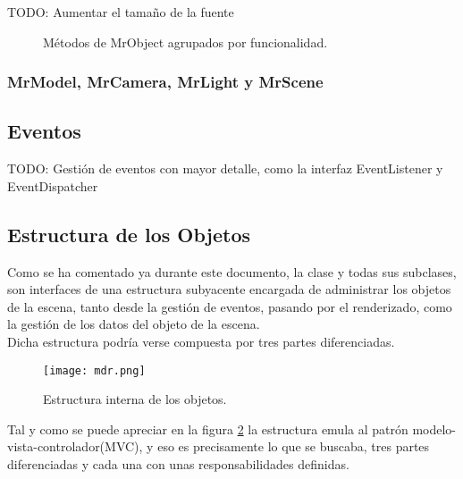 TODO: Aumentar el tamaño de la fuente
\begin{figure}[h!]
\centering
{}
\hspace{0mm}
\caption[Métodos de MrObject]{Métodos de MrObject agrupados por funcionalidad.}
\label{fig:metodosmrobject}
\end{figure}

\subsubsection{MrModel, MrCamera, MrLight y MrScene}

\subsection{Eventos}
TODO: Gestión de eventos con mayor detalle, como la interfaz EventListener y EventDispatcher


\subsection{Estructura de los Objetos}
Como se ha comentado ya durante este documento, la clase \rorefobject y todas sus subclases, son interfaces de una estructura subyacente encargada de administrar los objetos de la escena, tanto desde la gestión de eventos, pasando por el renderizado, como la gestión de los datos del objeto de la escena.\\
Dicha estructura podría verse compuesta por tres partes diferenciadas.

\begin{figure}[h!]
\begin{center}
\texttt{[image: mdr.png]}
\end{center}
\caption[Estructura interna de los objetos]{Estructura interna de los objetos.}
\label{fig:mdr}
\end{figure}

Tal y como se puede apreciar en la figura \ref{fig:mdr} la estructura emula al patrón modelo-vista-controlador(MVC), y eso es precisamente lo que se buscaba, tres partes diferenciadas y cada una con unas responsabilidades definidas.

